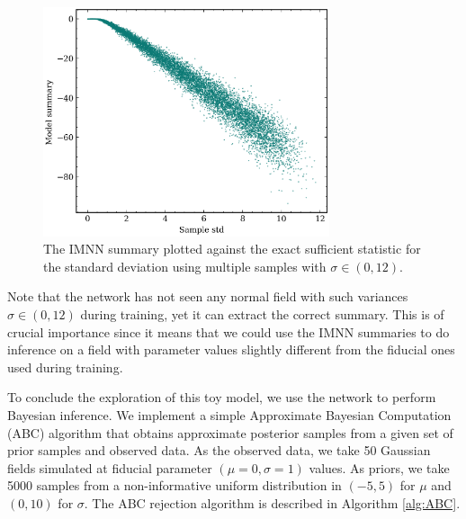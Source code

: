 \begin{figure}
    \centering
    \includegraphics[width=0.75\textwidth]{img/ML/std_vs_model.png}
    \caption{The IMNN summary plotted against the exact sufficient statistic for the standard deviation using multiple samples with $\sigma \in (0,12)$.}
    \label{fig:IMNN normal std}
\end{figure}
Note that the network has not seen any normal field with such variances $\sigma \in (0,12)$ during training, yet it can extract the correct summary. This is of crucial importance since it means that we could use the IMNN summaries to do inference on a field with parameter values slightly different from the fiducial ones used during training.


To conclude the exploration of this toy model, we use the network to perform Bayesian inference. We implement a simple Approximate Bayesian Computation (ABC) \cite{review_ABC} algorithm that obtains approximate posterior samples from a given set of prior samples and observed data. As the observed data, we take 50 Gaussian fields simulated at fiducial parameter $(\mu=0, \sigma=1)$ values. As priors, we take 5000 samples from a non-informative uniform distribution in $(-5, 5)$ for $\mu$ and $(0, 10)$ for $\sigma$. The ABC rejection algorithm is described in Algorithm \ref{alg:ABC}.


